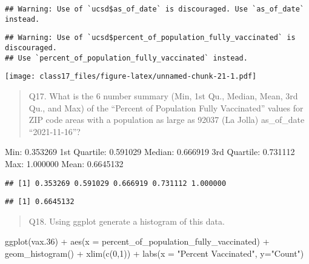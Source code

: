 \documentclass[
]{article}
\newenvironment{Shaded}{\begin{snugshade}}{\end{snugshade}}
\newcommand{\AttributeTok}[1]{\textcolor[rgb]{0.77,0.63,0.00}{#1}}
\newcommand{\DecValTok}[1]{\textcolor[rgb]{0.00,0.00,0.81}{#1}}
\newcommand{\FloatTok}[1]{\textcolor[rgb]{0.00,0.00,0.81}{#1}}
\newcommand{\FunctionTok}[1]{\textcolor[rgb]{0.00,0.00,0.00}{#1}}
\newcommand{\NormalTok}[1]{#1}
\newcommand{\SpecialCharTok}[1]{\textcolor[rgb]{0.00,0.00,0.00}{#1}}
\newcommand{\StringTok}[1]{\textcolor[rgb]{0.31,0.60,0.02}{#1}}
\begin{document}
\begin{verbatim}
## Warning: Use of `ucsd$as_of_date` is discouraged. Use `as_of_date` instead.
\end{verbatim}

\begin{verbatim}
## Warning: Use of `ucsd$percent_of_population_fully_vaccinated` is discouraged.
## Use `percent_of_population_fully_vaccinated` instead.
\end{verbatim}

\texttt{[image: class17\_files/figure-latex/unnamed-chunk-21-1.pdf]}

\begin{quote}
Q17. What is the 6 number summary (Min, 1st Qu., Median, Mean, 3rd Qu.,
and Max) of the ``Percent of Population Fully Vaccinated'' values for
ZIP code areas with a population as large as 92037 (La Jolla)
as\_of\_date ``2021-11-16''?
\end{quote}

Min: 0.353269 1st Quartile: 0.591029 Median: 0.666919 3rd Quartile:
0.731112 Max: 1.000000 Mean: 0.6645132

\begin{Shaded}
\end{Shaded}

\begin{verbatim}
## [1] 0.353269 0.591029 0.666919 0.731112 1.000000
\end{verbatim}

\begin{Shaded}
\end{Shaded}

\begin{verbatim}
## [1] 0.6645132
\end{verbatim}

\begin{quote}
Q18. Using ggplot generate a histogram of this data.
\end{quote}

\begin{Shaded}
\begin{Highlighting}[]
\FunctionTok{ggplot}\NormalTok{(vax}\FloatTok{.36}\NormalTok{) }\SpecialCharTok{+}
  \FunctionTok{aes}\NormalTok{(}\AttributeTok{x =}\NormalTok{ percent\_of\_population\_fully\_vaccinated) }\SpecialCharTok{+}
  \FunctionTok{geom\_histogram}\NormalTok{() }\SpecialCharTok{+}
  \FunctionTok{xlim}\NormalTok{(}\FunctionTok{c}\NormalTok{(}\DecValTok{0}\NormalTok{,}\DecValTok{1}\NormalTok{)) }\SpecialCharTok{+}
  \FunctionTok{labs}\NormalTok{(}\AttributeTok{x =} \StringTok{"Percent Vaccinated"}\NormalTok{, }\AttributeTok{y=}\StringTok{"Count"}\NormalTok{)}
\end{Highlighting}
\end{Shaded}
\end{document}
